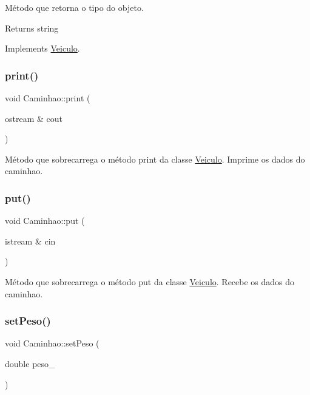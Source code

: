 Método que retorna o tipo do objeto. \begin{DoxyReturn}{Returns}
string 
\end{DoxyReturn}


Implements \hyperlink{classVeiculo}{Veiculo}.

\mbox{\label{classCaminhao_a5ba8b7a769a300b10595a4aa55ccbf8c}} 
\subsubsection{\texorpdfstring{print()}{print()}}
{\footnotesize\ttfamily void Caminhao\+::print (\begin{DoxyParamCaption}\item[{ostream \&}]{cout }\end{DoxyParamCaption})}

Método que sobrecarrega o método print da classe \hyperlink{classVeiculo}{Veiculo}. Imprime os dados do caminhao. \mbox{\label{classCaminhao_a80131907cd5b7ef1d138e70dba4b0c0d}} 
\subsubsection{\texorpdfstring{put()}{put()}}
{\footnotesize\ttfamily void Caminhao\+::put (\begin{DoxyParamCaption}\item[{istream \&}]{cin }\end{DoxyParamCaption})}

Método que sobrecarrega o método put da classe \hyperlink{classVeiculo}{Veiculo}. Recebe os dados do caminhao. \mbox{\label{classCaminhao_a744ca750962ca3fbabe6caeb2ccd7e02}} 
\subsubsection{\texorpdfstring{set\+Peso()}{setPeso()}}
{\footnotesize\ttfamily void Caminhao\+::set\+Peso (\begin{DoxyParamCaption}\item[{double}]{peso\+\_\+ }\end{DoxyParamCaption})}

